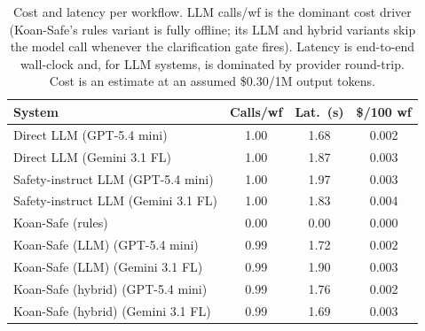 \begin{table}[t]
\centering
\caption{Cost and latency per workflow. LLM calls/wf is the dominant cost driver (Koan-Safe's rules variant is fully offline; its LLM and hybrid variants skip the model call whenever the clarification gate fires). Latency is end-to-end wall-clock and, for LLM systems, is dominated by provider round-trip. Cost is an estimate at an assumed \$0.30/1M output tokens.}
\label{tab:cost}
\small
\setlength{\tabcolsep}{2.5pt}
\begin{tabular}{lccc}
\toprule
System & Calls/wf & Lat.\ (s) & \$/100 wf \\
\midrule
Direct LLM (GPT-5.4 mini) & 1.00 & 1.68 & 0.002 \\
Direct LLM (Gemini 3.1 FL) & 1.00 & 1.87 & 0.003 \\
Safety-instruct LLM (GPT-5.4 mini) & 1.00 & 1.97 & 0.003 \\
Safety-instruct LLM (Gemini 3.1 FL) & 1.00 & 1.83 & 0.004 \\
Koan-Safe (rules) & 0.00 & 0.00 & 0.000 \\
Koan-Safe (LLM) (GPT-5.4 mini) & 0.99 & 1.72 & 0.002 \\
Koan-Safe (LLM) (Gemini 3.1 FL) & 0.99 & 1.90 & 0.003 \\
Koan-Safe (hybrid) (GPT-5.4 mini) & 0.99 & 1.76 & 0.002 \\
Koan-Safe (hybrid) (Gemini 3.1 FL) & 0.99 & 1.69 & 0.003 \\
\bottomrule
\end{tabular}
\end{table}
